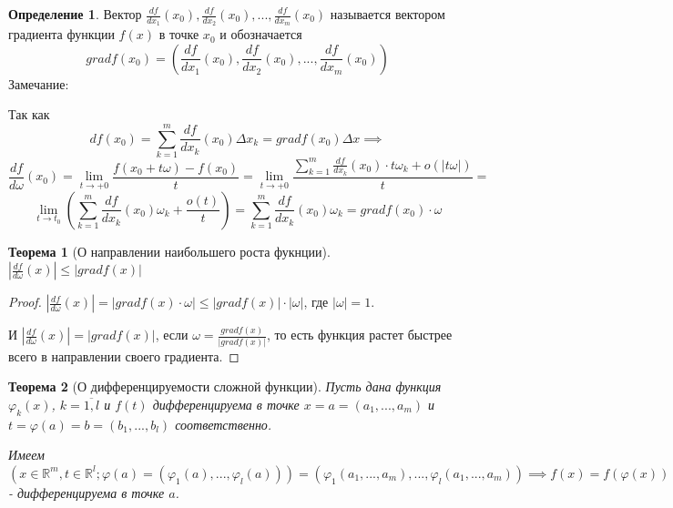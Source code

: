 \documentclass[a4paper,oneside]{article}
\newcommand{\R}{\mathbb{R}}
\newtheorem{theorem}{Теорема}[subsection]
\theoremstyle{definition}
\newtheorem{definition}{Определение}[subsection]
\theoremstyle{definition}
\theoremstyle{definition}
\begin{document}
\begin{definition}
    Вектор $\frac{df}{dx_1}(x_0), \frac{df}{dx_2}(x_0), ..., \frac{df}{dx_m}(x_0)$ называется вектором градиента функции $f(x)$ в точке $x_0$ и обозначается
    $$grad f(x_0) = (\frac{df}{dx_1}(x_0), \frac{df}{dx_2}(x_0), ..., \frac{df}{dx_m}(x_0))$$
    Замечание:

    Так как $$df(x_0) = \sum_{k=1}^m\frac{df}{dx_k}(x_0)\Delta x_k = grad f(x_0) \Delta x \implies$$
    $$\frac{df}{d\omega}(x_0) = \lim_{t \to +0}\frac{f(x_0+t\omega)-f(x_0)}{t} = \lim_{t \to +0}\frac{\sum_{k=1}^m\frac{df}{dx_k}(x_0)\cdot t\omega_k + o(|t\omega|)}{t} =$$
    $$\lim_{t \to t_0}(\sum_{k=1}^m\frac{df}{dx_k}(x_0)\omega_k+\frac{o(t)}{t}) = \sum_{k=1}^m\frac{df}{dx_k}(x_0)\omega_k = grad f(x_0)\cdot\omega$$
\end{definition}

\begin{theorem}[О направлении наибольшего роста фукнции]
    $|\frac{df}{d\omega}(x)| \leq |grad f(x)|$
\end{theorem}
\begin{proof}
    $|\frac{df}{d\omega}(x)| = |grad f(x)\cdot\omega| \leq |grad f(x)|\cdot|\omega|$, где $|\omega| = 1$.

    И $|\frac{df}{d\omega}(x)| = |grad f(x)|$, если $\omega = \frac{gradf(x)}{|gradf(x)|}$, то есть функция растет быстрее всего в направлении своего градиента.
\end{proof}

\begin{theorem}[О дифференцируемости сложной функции]
    Пусть дана функция $\varphi_k(x)$, $k = \overline{1,l}$ и $f(t)$ дифференцируема в точке $x = a = (a_1,...,a_m)$ и $t = \varphi(a) = b = (b_1,...,b_l)$ соответственно.
    
    Имеем $(x\in\R^m, t\in\R^l; \varphi(a) = (\varphi_1(a),...,\varphi_l(a))) = (\varphi_1(a_1,...,a_m),...,\varphi_l(a_1,...,a_m)) \implies f(x)=f(\varphi(x))$ - дифференцируема в точке $a$.
\end{theorem}
\end{document}
